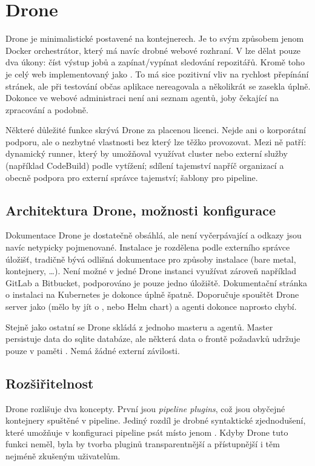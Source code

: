 \section{Drone}
    Drone je minimalistické \CI postavené na kontejnerech. Je to svým způsobem jenom Docker orchestrátor, který má navíc drobné webové rozhraní. V  lze dělat pouze dva úkony: číst výstup jobů a zapínat/vypínat sledování repozitářů. Kromě toho je celý web implementovaný jako . To má sice pozitivní vliv na rychlost přepínání stránek, ale při testování občas aplikace nereagovala a několikrát se zasekla úplně. Dokonce ve webové administraci není ani seznam agentů, joby čekající na zpracování a podobně.

    Některé důležité funkce skrývá Drone za placenou licenci. Nejde ani o korporátní podporu, ale o nezbytné vlastnosti bez který lze \CI těžko provozovat. Mezi ně patří: dynamický runner, který by umožňoval využívat cluster nebo externí služby (například  CodeBuild) podle vytížení; sdílení tajemství napříč organizací a obecně podpora pro externí správce tajemství; šablony pro pipeline.

    \subsection{Architektura Drone, možnosti konfigurace}
        Dokumentace Drone je dostatečně obsáhlá, ale není vyčerpávající a odkazy jsou navíc netypicky pojmenované. Instalace je rozdělena podle externího správce úložišť, tradičně bývá odlišná dokumentace pro způsoby instalace (bare metal, kontejnery, \ldots). Není možné v jedné Drone instanci využívat zároveň například GitLab a Bitbucket, podporováno je pouze jedno úložiště. Dokumentační stránka o instalaci na Kubernetes je dokonce úplně špatně. Doporučuje spouštět Drone server jako  (mělo by jít o , nebo Helm chart) a agenti dokonce naprosto chybí.

        Stejně jako ostatní \CI se Drone skládá z jednoho masteru a agentů. Master persistuje data do sqlite databáze, ale některá data o frontě požadavků udržuje pouze v paměti \cite{drone-ha}. Nemá žádné externí závilosti.

    \subsection{Rozšiřitelnost}
        Drone rozlišuje dva koncepty. První jsou \textit{pipeline plugins}, což jsou obyčejné kontejnery spuštěné v pipeline. Jediný rozdíl je drobné syntaktické zjednodušení, které umožňuje v konfiguraci pipeline psát místo  jenom . Kdyby Drone tuto funkci neměl, byla by tvorba pluginů transparentnější a přístupnější i těm nejméně zkušeným uživatelům.

